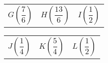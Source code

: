 \bigskip
{}

\begin{tabularx}{\linewidth}{*{3}{X}}
$G\left(\dfrac{7}{6}\right)$&
$H\left(\dfrac{13}{6}\right)$&
$I\left(\dfrac{1}{2}\right)$\\	
\end{tabularx}

\bigskip
{}

\begin{tabularx}{\linewidth}{*{3}{X}}
$J\left(\dfrac{1}{4}\right)$&
$K\left(\dfrac{5}{4}\right)$&
$L\left(\dfrac{1}{2}\right)$\\	
\end{tabularx}

\bigskip
{}